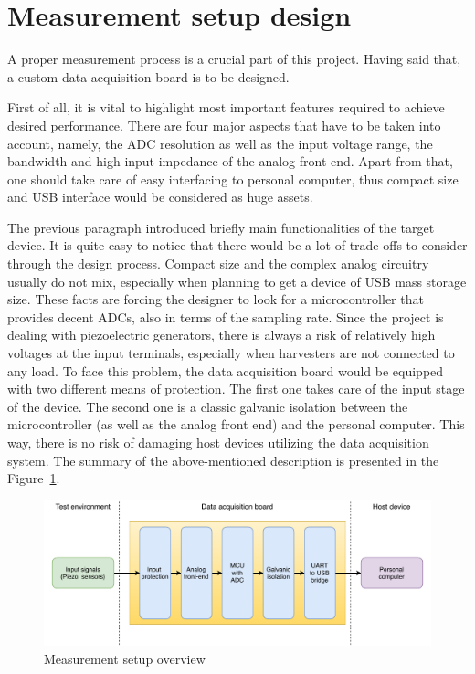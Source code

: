 \documentclass[12pt,a4paper]{article}
\begin{document}
\section{Measurement setup design}

A proper measurement process is a crucial part of this project. Having said that, a custom data acquisition board is to be designed. 
\par

First of all, it is vital to highlight most important features required to achieve desired performance. There are four major aspects that have to be taken into account, namely, the ADC resolution as well as the input voltage range, the bandwidth and high input impedance of the analog front-end. Apart from that, one should take care of easy interfacing to personal computer, thus compact size and USB interface would be considered as huge assets.
\par
The previous paragraph introduced briefly main functionalities of the target device. It is quite easy to notice that there would be a lot of trade-offs to consider through the design process. Compact size and the complex analog circuitry usually do not mix, especially when planning to get a device of USB mass storage size. These facts are forcing the designer to look for a microcontroller that provides decent ADCs, also in terms of the sampling rate. Since the project is dealing with piezoelectric generators, there is always a risk of relatively high voltages at the input terminals, especially when harvesters are not connected to any load. To face this problem, the data acquisition board would be equipped with two different means of protection. The first one takes care of the input stage of the device. The second one is a classic galvanic isolation between the microcontroller (as well as the analog front end) and the personal computer. This way, there is no risk of damaging host devices utilizing the data acquisition system. The summary of the above-mentioned description is presented in the Figure~\ref{fig:meas_overview}.\par

\begin{figure}[h!]
\includegraphics[scale=0.8]{measurement_setup_overview.pdf}
\caption{Measurement setup overview}
\label{fig:meas_overview}
\end{figure}
\end{document}
